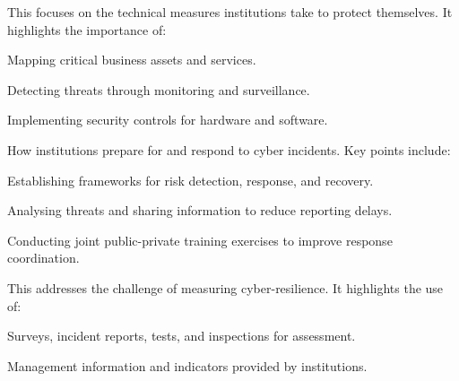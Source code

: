 
This focuses on the technical measures institutions take to protect themselves.
It highlights the importance of:

\begin{lettered}
\item Mapping critical business assets and services.
\item Detecting threats through monitoring and surveillance.
\item Implementing security controls for hardware and software.
\end{lettered}


How institutions prepare for and respond to cyber incidents. Key points include:

\begin{lettered}
\item Establishing frameworks for risk detection, response, and recovery.
\item Analysing threats and sharing information to reduce reporting delays.
\item Conducting joint public-private training exercises to improve response
coordination.
\end{lettered}


This addresses the challenge of measuring cyber-resilience. It highlights the use
of:

\begin{lettered}
\item Surveys, incident reports, tests, and inspections for assessment.
\item Management information and indicators provided by institutions.
\end{lettered}




